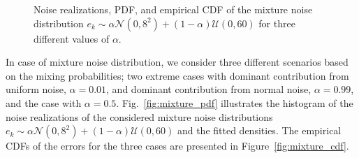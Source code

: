 \documentclass{article}
\begin{document}
\begin{figure}[b]
	\centering
	\hfil
	\caption{Noise realizations, PDF, and empirical CDF of the mixture noise distribution $e_k\sim \alpha\mathcal{N}(0,8^2) + (1-\alpha)\mathcal{U}(0,60)$ for three different values of $\alpha$.}
	\label{fig:mixture_noise}
\end{figure}
%
%

In case of mixture noise distribution, we consider three different scenarios based on the mixing probabilities; two extreme cases with dominant contribution from uniform noise, $\alpha=0.01$, and dominant contribution from normal noise, $\alpha=0.99$, and the case with $\alpha=0.5$. Fig.~\ref{fig:mixture_pdf} illustrates the histogram of the noise realizations of the considered mixture noise distributions $e_k\sim \alpha\mathcal{N}(0,8^2) + (1-\alpha)\mathcal{U}(0,60)$ and the fitted densities.  The empirical CDFs of the errors for the three cases are presented in Figure~\ref{fig:mixture_cdf}. 

\end{document}
